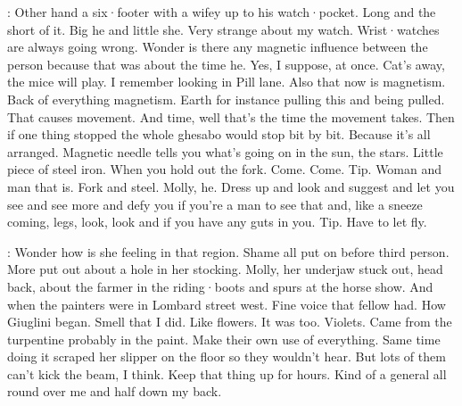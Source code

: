 \Bloom:
Other hand
a six·footer with a wifey up to his watch·pocket.
Long and the short of it.
Big he
and little she.
Very strange about my watch.
Wrist·watches are always going wrong.
Wonder is there any magnetic influence
between the person
because that was about the time he.
Yes,
I suppose,
at once.
Cat's away,
the mice will play.
I remember looking in Pill lane.
Also that now is magnetism.
Back of everything magnetism.
Earth
for instance
pulling this
and being pulled.
That causes movement.
And time,
well that's the time
the movement takes.
Then if one thing stopped
the whole ghesabo would stop bit by bit.
Because it's all arranged.
Magnetic needle tells you
what's going on in the sun,
the stars.
Little piece of steel iron.
When you hold out the fork.
Come.
Come.
Tip.
Woman and man
that is.
Fork and steel.
Molly,
he.
Dress up
and look
and suggest
and let you see and see more
and defy you
if you're a man to see
that
and,
like a sneeze coming,
legs,
look,
look
and if you have any guts in you.
Tip.
Have to let fly.

\Bloom:
Wonder how is she feeling
in that region.
Shame
all put on before third person.
More put out
about a hole in her stocking.
Molly,
her underjaw stuck out,
head back,
about the farmer in the riding·boots and spurs
at the horse show.
And when the painters were in Lombard street west.
Fine voice that fellow had.
How Giuglini began.
Smell that I did.
Like flowers.
It was too.
Violets.
Came from the turpentine probably
in the paint.
Make their own use of everything.
Same time doing it
scraped her slipper on the floor
so they wouldn't hear.
But lots of them can't kick the beam,
I think.
Keep that thing up for hours.
Kind of a general all round over me
and half down my back.

